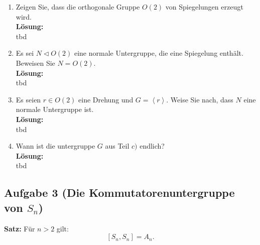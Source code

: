 \documentclass[11pt,a4paper,ngerman]{article}
\begin{document}
\begin{enumerate}[\bfseries a)]
\item Zeigen Sie, dass die orthogonale Gruppe $O(2)$ von Spiegelungen erzeugt wird.\\

\textbf{Lösung:}\\

tbd

\item Es sei $N \vartriangleleft O(2)$ eine normale Untergruppe, die eine Spiegelung enthält. Beweisen Sie $N = O(2)$.\\

\textbf{Lösung:}\\

tbd

\item Es seien $r \in O(2)$ eine Drehung und $G = \left< r \right>$. Weise Sie nach, dass $N$ eine normale Untergruppe ist.\\

\textbf{Lösung:}\\

tbd

\item Wann ist die untergruppe $G$ aus Teil $c)$ endlich?\\

\textbf{Lösung:}\\

tbd

\end{enumerate}


\subsection*{Aufgabe 3 \mdseries (Die Kommutatorenuntergruppe von $S_n$)}

\textbf{Satz:} Für $n>2$ gilt:
$$
\left[ S_n , S_n \right] = A_n.
$$
\end{document}
